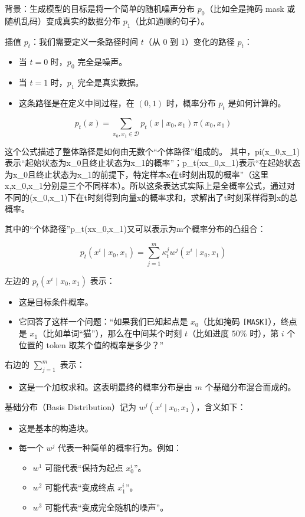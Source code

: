 背景：生成模型的目标是将一个简单的随机噪声分布 \(p_0\)（比如全是掩码 mask 或随机乱码）变成真实的数据分布 \(p_1\)（比如通顺的句子）。

插值 \(p_t\)：我们需要定义一条路径时间 \(t\)（从 \(0\) 到 \(1\)）变化的路径 \(p_t\)：

\begin{itemize}
\tightlist
\item
  当 \(t=0\) 时，\(p_0\) 完全是噪声。
\item
  当 \(t=1\) 时，\(p_1\) 完全是真实数据。
\item
  这条路径是在定义中间过程，在 \((0,1)\) 时，概率分布 \(p_t\) 是如何计算的。
\end{itemize}

\[
p_t(x)=\sum_{x_0,x_1\in\mathcal{D}}p_t(x\mid x_0,x_1)\pi(x_0,x_1)
\]

这个公式描述了整体路径是如何由无数个``个体路径''组成的。
其中，pi(x\_0,x\_1)表示``起始状态为x\_0且终止状态为x\_1的概率''；p\_t(x\textbar x\_0,x\_1)表示``在起始状态为x\_0且终止状态为x\_1的前提下，特定样本x在t时刻出现的概率''（这里x,x\_0,x\_1分别是三个不同样本）。所以这条表达式实际上是全概率公式，通过对不同的(x\_0,x\_1)下在t时刻得到向量x的概率求和，求解出了t时刻采样得到x的总概率。

其中的``个体路径''p\_t(x\textbar x\_0,x\_1)又可以表示为m个概率分布的凸组合：

\[
p_t(x^i\mid x_0,x_1)=\sum_{j=1}^m\kappa_t^j w^j(x^i\mid x_0,x_1)
\]

左边的 \(p_t(x^i\mid x_0,x_1)\) 表示：

\begin{itemize}
\tightlist
\item
  这是目标条件概率。
\item
  它回答了这样一个问题：``如果我们已知起点是 \(x_0\)（比如掩码 \texttt{{[}MASK{]}}），终点是 \(x_1\)（比如单词``猫''），那么在中间某个时刻 \(t\)（比如进度 \(50\%\) 时），第 \(i\) 个位置的 token 取某个值的概率是多少？''
\end{itemize}

右边的 \(\sum_{j=1}^m\) 表示：

\begin{itemize}
\tightlist
\item
  这是一个加权求和。这表明最终的概率分布是由 \(m\) 个基础分布混合而成的。
\end{itemize}

基础分布（Basis Distribution）记为 \(w^j(x^i\mid x_0,x_1)\)，含义如下：

\begin{itemize}
\tightlist
\item
  这是基本的构造块。
\item
  每一个 \(w^j\) 代表一种简单的概率行为。例如：

  \begin{itemize}
  \tightlist
  \item
    \(w^1\) 可能代表``保持为起点 \(x_0^i\)''。
  \item
    \(w^2\) 可能代表``变成终点 \(x_1^i\)''。
  \item
    \(w^3\) 可能代表``变成完全随机的噪声''。
  \end{itemize}
\end{itemize}

